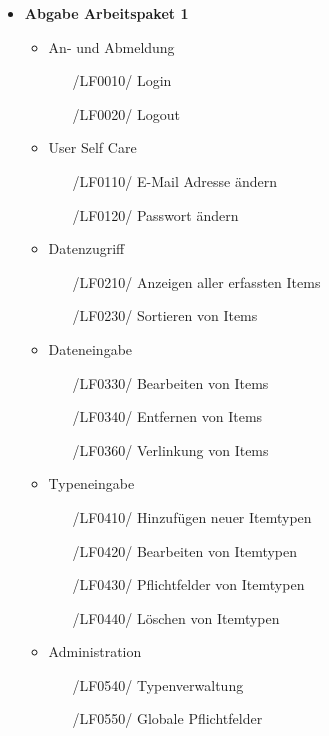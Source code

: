 \documentclass[11pt,a4paper]{report}
\begin{document}
\begin{itemize}
\item
  \textbf{Abgabe Arbeitspaket 1}
  
  \begin{itemize}
  	\item
  		An- und Abmeldung
  		\begin{itemize}
  		\leftskip=3em
  		\item[/LF0010/] Login
  		\item[/LF0020/] Logout
  		\end{itemize}
  	\item
    	User Self Care
    	\begin{itemize}
    	\leftskip=3em
    	\item[/LF0110/] E-Mail Adresse ändern
    	\item[/LF0120/] Passwort ändern
    	\end{itemize}
    \item
    	Datenzugriff
    	\begin{itemize}
    	\leftskip=3em
    	\item[/LF0210/] Anzeigen aller erfassten Items
    	\item[/LF0230/] Sortieren von Items
    	\end{itemize}
    \item
    	Dateneingabe
    	\begin{itemize}
    	\leftskip=3em
    	\item[/LF0330/] Bearbeiten von Items
    	\item[/LF0340/] Entfernen von Items
     	\item[/LF0360/] Verlinkung von Items
    	\end{itemize}
  	\item
    	Typeneingabe
    	\begin{itemize}
    	\leftskip=3em
    	\item[/LF0410/] Hinzufügen neuer Itemtypen
    	\item[/LF0420/] Bearbeiten von Itemtypen
    	\item[/LF0430/] Pflichtfelder von Itemtypen
    	\item[/LF0440/] Löschen von Itemtypen
    	\end{itemize}
  	\item
    	Administration
    	\begin{itemize}
    	\leftskip=3em
    	\item[/LF0540/] Typenverwaltung
    	\item[/LF0550/] Globale Pflichtfelder
    	\end{itemize}
  \end{itemize}


\end{itemize}
\end{document}
